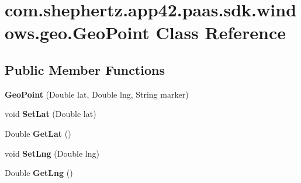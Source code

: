 \hypertarget{classcom_1_1shephertz_1_1app42_1_1paas_1_1sdk_1_1windows_1_1geo_1_1_geo_point}{\section{com.\+shephertz.\+app42.\+paas.\+sdk.\+windows.\+geo.\+Geo\+Point Class Reference}
\label{classcom_1_1shephertz_1_1app42_1_1paas_1_1sdk_1_1windows_1_1geo_1_1_geo_point}
}
\subsection*{Public Member Functions}
\begin{DoxyCompactItemize}
\item 
\hypertarget{classcom_1_1shephertz_1_1app42_1_1paas_1_1sdk_1_1windows_1_1geo_1_1_geo_point_ae46edea8c0a8a303b4393dec86632304}{{\bfseries Geo\+Point} (Double lat, Double lng, String marker)}\label{classcom_1_1shephertz_1_1app42_1_1paas_1_1sdk_1_1windows_1_1geo_1_1_geo_point_ae46edea8c0a8a303b4393dec86632304}

\item 
\hypertarget{classcom_1_1shephertz_1_1app42_1_1paas_1_1sdk_1_1windows_1_1geo_1_1_geo_point_a943eee5c831d83ae8998c8cadb1d6699}{void {\bfseries Set\+Lat} (Double lat)}\label{classcom_1_1shephertz_1_1app42_1_1paas_1_1sdk_1_1windows_1_1geo_1_1_geo_point_a943eee5c831d83ae8998c8cadb1d6699}

\item 
\hypertarget{classcom_1_1shephertz_1_1app42_1_1paas_1_1sdk_1_1windows_1_1geo_1_1_geo_point_a05810de4d1ce11c5315fc727c048a792}{Double {\bfseries Get\+Lat} ()}\label{classcom_1_1shephertz_1_1app42_1_1paas_1_1sdk_1_1windows_1_1geo_1_1_geo_point_a05810de4d1ce11c5315fc727c048a792}

\item 
\hypertarget{classcom_1_1shephertz_1_1app42_1_1paas_1_1sdk_1_1windows_1_1geo_1_1_geo_point_a46962bd47f0be3ca505880a157730c70}{void {\bfseries Set\+Lng} (Double lng)}\label{classcom_1_1shephertz_1_1app42_1_1paas_1_1sdk_1_1windows_1_1geo_1_1_geo_point_a46962bd47f0be3ca505880a157730c70}

\item 
\hypertarget{classcom_1_1shephertz_1_1app42_1_1paas_1_1sdk_1_1windows_1_1geo_1_1_geo_point_adaed3f556852fe2149958c7d7b11df87}{Double {\bfseries Get\+Lng} ()}\label{classcom_1_1shephertz_1_1app42_1_1paas_1_1sdk_1_1windows_1_1geo_1_1_geo_point_adaed3f556852fe2149958c7d7b11df87}


\end{DoxyCompactItemize}

